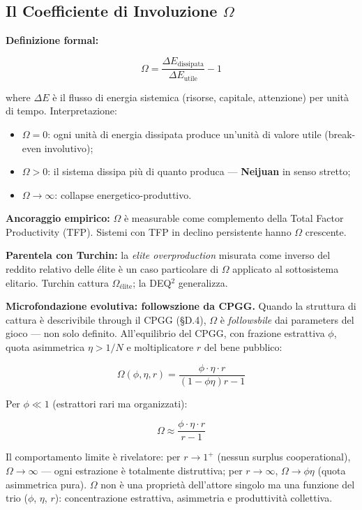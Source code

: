 \subsection{\texorpdfstring{Il Coefficiente di Involuzione
\(\Omega\)}{Il Coefficiente di Involuzione \textbackslash Omega}}\label{il-coefficiente-di-involution-omega}

\Proved{} \textbf{Definizione formal:}

\[
\Omega = \frac{\Delta E_{\text{dissipata}}}{\Delta E_{\text{utile}}} - 1
\]

where \(\Delta E\) è il flusso di energia sistemica (risorse, capitale,
attenzione) per unità di tempo. Interpretazione:

\begin{itemize}
\tightlist
\item
  \(\Omega = 0\): ogni unità di energia dissipata produce un'unità di
  valore utile (break-even involutivo);
\item
  \(\Omega > 0\): il sistema dissipa più di quanto produca ---
  \textbf{Neijuan} in senso stretto;
\item
  \(\Omega \to \infty\): collapse energetico-produttivo.
\end{itemize}

\Hypoth{} \textbf{Ancoraggio empirico:} \(\Omega\) è measurable come
complemento della Total Factor Productivity (TFP). Sistemi con TFP in
declino persistente hanno \(\Omega\) crescente.

\Hypoth{} \textbf{Parentela con Turchin:} la \emph{elite overproduction}
misurata come inverso del reddito relativo delle élite è un caso
particolare di \(\Omega\) applicato al sottosistema elitario. Turchin
cattura \(\Omega_{\text{élite}}\); la DEQ$^2$ generalizza.

\Proved{} \textbf{Microfondazione evolutiva: followszione da CPGG.}
Quando la struttura di cattura è descrivibile through il CPGG
(§D.4), \(\Omega\) è \emph{followsbile} dai parameters del gioco ---
non solo definito. All'equilibrio del CPGG, con frazione estrattiva
\(\phi\), quota asimmetrica \(\eta > 1/N\) e moltiplicatore \(r\) del
bene pubblico:

\[
\Omega(\phi,\eta,r) = \frac{\phi\cdot\eta\cdot r}{(1-\phi\eta)r - 1}
\]

Per \(\phi \ll 1\) (estrattori rari ma organizzati):

\[
\boxed{\Omega \approx \frac{\phi\cdot\eta\cdot r}{r-1}} \tag{P4}
\]

Il comportamento limite è rivelatore: per \(r \to 1^+\) (nessun
surplus cooperational), \(\Omega \to \infty\) --- ogni estrazione è
totalmente distruttiva; per \(r \to \infty\), \(\Omega \to \phi\eta\)
(quota asimmetrica pura). \(\Omega\) non è una proprietà dell'attore
singolo ma una funzione del trio (\(\phi\), \(\eta\), \(r\)):
concentrazione estrattiva, asimmetria e produttività collettiva.



